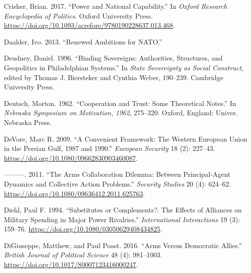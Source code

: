 \documentclass[
  12,
  letterpaper,
  DIV=11,
  numbers=noendperiod]{scrartcl}
\newlength{\cslhangindent}
\newlength{\cslentryspacingunit} %
\newenvironment{CSLReferences}[2] %
 {%
  \setlength{\parindent}{0pt}
  \ifodd #1
  \let\oldpar\par
  \def\par{\hangindent=\cslhangindent\oldpar}
  \fi
  \setlength{\parskip}{#2\cslentryspacingunit}
 }%
 {}
\begin{document}
\begin{CSLReferences}{1}{0}
\leavevmode{}%
Crisher, Brian. 2017. {``Power and {National Capability}.''} In
\emph{Oxford {Research Encyclopedia} of {Politics}}. {Oxford University
Press}. \url{https://doi.org/10.1093/acrefore/9780190228637.013.468}.

\leavevmode{}%
Daalder, Ivo. 2013. {``Renewed {Ambitions} for {NATO}.''}

\leavevmode{}%
Deudney, Daniel. 1996. {``Binding {Sovereigns}: {Authorities},
{Structures}, and {Geopolitics} in {Philadelphian Systems}.''} In
\emph{State {Sovereignty} as {Social Construct}}, edited by Thomas J.
Biersteker and Cynthia Weber, 190--239. {Cambridge University Press}.

\leavevmode{}%
Deutsch, Morton. 1962. {``Cooperation and Trust: {Some} Theoretical
Notes.''} In \emph{Nebraska {Symposium} on {Motivation}, 1962},
275--320. {Oxford, England}: {Univer. Nebraska Press}.

\leavevmode{}%
DeVore, Marc R. 2009. {``A Convenient Framework: The {Western European
Union} in the {Persian Gulf}, 1987 and
1990.''} \emph{European Security} 18 (2): 227--43.
\url{https://doi.org/10.1080/09662830903460087}.

\leavevmode{}%
---------. 2011. {``The {Arms Collaboration Dilemma}: {Between
Principal-Agent Dynamics} and {Collective Action Problems}.''}
\emph{Security Studies} 20 (4): 624--62.
\url{https://doi.org/10.1080/09636412.2011.625763}.

\leavevmode{}%
Diehl, Paul F. 1994. {``Substitutes or Complements?: {The} Effects of
Alliances on Military Spending in Major Power Rivalries.''}
\emph{International Interactions} 19 (3): 159--76.
\url{https://doi.org/10.1080/03050629408434825}.

\leavevmode{}%
DiGiuseppe, Matthew, and Paul Poast. 2016. {``Arms Versus {Democratic
Allies}.''} \emph{British Journal of Political Science} 48 (4):
981--1003. \url{https://doi.org/10.1017/S0007123416000247}.


\end{CSLReferences}
\end{document}

